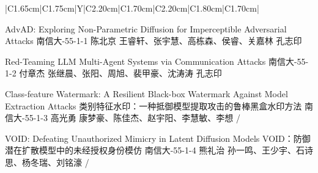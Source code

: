 \Needspace{7.5cm}
\begin{tabularx}{\textwidth}{|C{1.65cm}|C{1.75cm}|Y|C{2.20cm}|C{1.70cm}|C{2.20cm}|C{1.80cm}|C{1.70cm}|}
\HeaderRow

{AdvAD: Exploring Non-Parametric Diffusion for Imperceptible Adversarial Attacks \newline }
{南信大-55-1-1}
{陈北京}
{王睿轩、张宇慧、高栋森、侯睿、关嘉林}
{}{孔志印}

{Red-Teaming LLM Multi-Agent Systems via Communication Attacks \newline }
{南信大-55-1-2}
{付章杰}
{张继晨、张阳、周旭、裴甲豪、沈涛涛}
{}{孔志印}


{Class-feature Watermark: A Resilient Black-box Watermark Against Model Extraction Attacks     \newline  类别特征水印：一种抵御模型提取攻击的鲁棒黑盒水印方法}
{南信大-55-1-3}
{高光勇}
{康梦豪、陈佳杰、赵宇阳、李慧敏、李想}
{}{/}

{VOID: Defeating Unauthorized Mimicry in Latent Diffusion Models \newline VOID：防御潜在扩散模型中的未经授权身份模仿}
{南信大-55-1-4}
{熊礼治}
{孙一鸣、王少宇、石诗思、杨冬瑞、刘铭濠}
{}{/}
\end{tabularx}
\BlockGap







